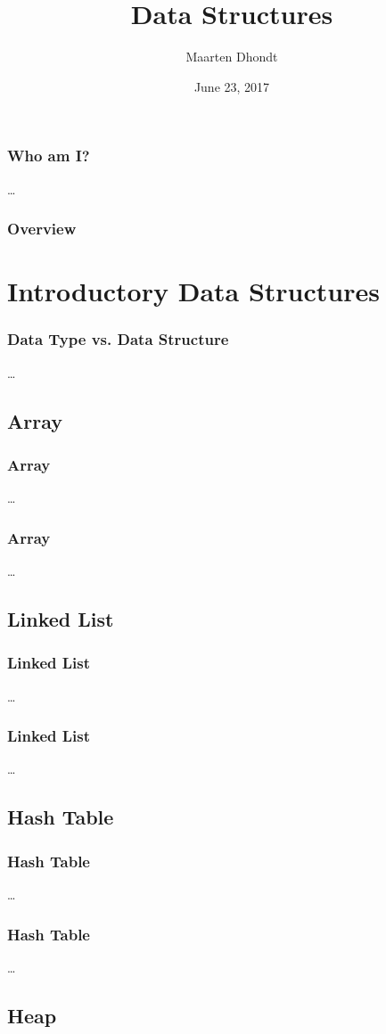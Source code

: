 \documentclass{beamer}
\title{Data Structures}
\author{Maarten Dhondt}
\institute{Realdolmen}
\date{June 23, 2017}
\begin{document}
\frame{\titlepage}

\begin{frame}
	\frametitle{Who am I?}
	\ldots
\end{frame}

\begin{frame}
  \frametitle{Overview}
  \tiny{\tableofcontents}
\end{frame}

\section{Introductory Data Structures}

\begin{frame}
	\frametitle{Data Type vs. Data Structure}
	\ldots
\end{frame}

\subsection{Array}

\begin{frame}
	\frametitle{Array}
	\ldots
\end{frame}
\begin{frame}
	\frametitle{Array}
	\ldots
\end{frame}

\subsection{Linked List}

\begin{frame}
	\frametitle{Linked List}
	\ldots
\end{frame}
\begin{frame}
	\frametitle{Linked List}
	\ldots
\end{frame}

\subsection{Hash Table}

\begin{frame}
	\frametitle{Hash Table}
	\ldots
\end{frame}
\begin{frame}
	\frametitle{Hash Table}
	\ldots
\end{frame}

\subsection{Heap}
\end{document}

